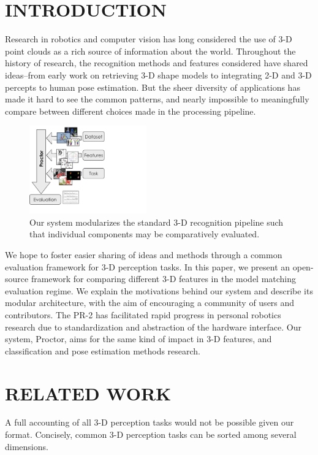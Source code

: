 \section{INTRODUCTION}
Research in robotics and computer vision has long considered the use of 3-D point clouds as a rich source of information about the world.
Throughout the history of research, the recognition methods and features considered have shared ideas--from early work on retrieving 3-D shape models to integrating 2-D and 3-D percepts to human pose estimation.
But the sheer diversity of applications has made it hard to see the common patterns, and nearly impossible to meaningfully compare between different choices made in the processing pipeline.

\begin{figure}[thpb]
   \centering
   \includegraphics[width=0.45\textwidth]{figures/figure1.pdf}
   \caption{Our system modularizes the standard 3-D recognition pipeline such that individual components may be comparatively evaluated.}
   \label{fig:figure1}
\end{figure}

We hope to foster easier sharing of ideas and methods through a common evaluation framework for 3-D perception tasks.
In this paper, we present an open-source framework for comparing different 3-D features in the model matching evaluation regime.
We explain the motivations behind our system and describe its modular architecture, with the aim of encouraging a community of users and contributors.
The PR-2  has facilitated rapid progress in personal robotics research due to standardization and abstraction of the hardware interface.
Our system, Proctor, aims for the same kind of impact in 3-D features, and classification and pose estimation methods research.

\section{RELATED WORK}

A full accounting of all 3-D perception tasks would not be possible given our format.
Concisely, common 3-D perception tasks can be sorted among several dimensions.

